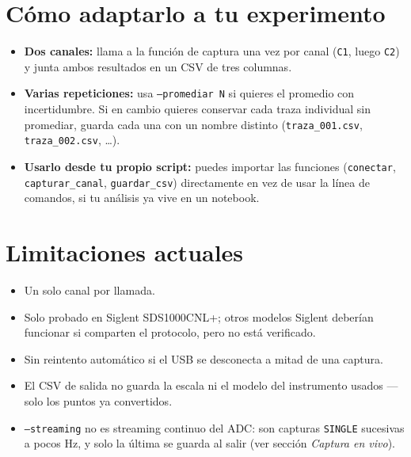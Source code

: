 \documentclass[11pt,a4paper]{article}
\begin{document}
\section{Cómo adaptarlo a tu experimento}
\begin{itemize}
  \item \textbf{Dos canales:} llama a la función de captura una vez por
        canal (\texttt{C1}, luego \texttt{C2}) y junta ambos resultados en
        un CSV de tres columnas.
  \item \textbf{Varias repeticiones:} usa \texttt{--promediar N} si quieres
        el promedio con incertidumbre. Si en cambio quieres conservar cada
        traza individual sin promediar, guarda cada una con un nombre
        distinto (\texttt{traza\_001.csv}, \texttt{traza\_002.csv}, \ldots).
  \item \textbf{Usarlo desde tu propio script:} puedes importar las
        funciones (\texttt{conectar}, \texttt{capturar\_canal},
        \texttt{guardar\_csv}) directamente en vez de usar la línea de
        comandos, si tu análisis ya vive en un notebook.
\end{itemize}

\section{Limitaciones actuales}
\begin{itemize}[label={$\square$}, itemsep=0pt, topsep=2pt]
  \item Un solo canal por llamada.
  \item Solo probado en Siglent SDS1000CNL+; otros modelos Siglent deberían
        funcionar si comparten el protocolo, pero no está verificado.
  \item Sin reintento automático si el USB se desconecta a mitad de una
        captura.
  \item El CSV de salida no guarda la escala ni el modelo del instrumento
        usados --- solo los puntos ya convertidos.
  \item \texttt{--streaming} no es streaming continuo del ADC: son capturas
        \texttt{SINGLE} sucesivas a pocos Hz, y solo la última se guarda al
        salir (ver sección \emph{Captura en vivo}).
\end{itemize}

\end{document}
